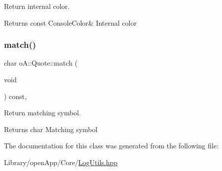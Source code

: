 Return internal color. 

\begin{DoxyReturn}{Returns}
const Console\+Color\& Internal color 
\end{DoxyReturn}
\mbox{\label{classo_a_1_1_quote_a3347e15b8ef676b7a5b2017b80e8befc}} 
\subsubsection{\texorpdfstring{match()}{match()}}
{\footnotesize\ttfamily char o\+A\+::\+Quote\+::match (\begin{DoxyParamCaption}\item[{void}]{ }\end{DoxyParamCaption}) const\hspace{0.3cm}{\ttfamily [inline]}, {\ttfamily [noexcept]}}



Return matching symbol. 

\begin{DoxyReturn}{Returns}
char Matching symbol 
\end{DoxyReturn}


The documentation for this class was generated from the following file\+:\begin{DoxyCompactItemize}
\item 
Library/open\+App/\+Core/\mbox{\hyperlink{_log_utils_8hpp}{Log\+Utils.\+hpp}}\end{DoxyCompactItemize}
